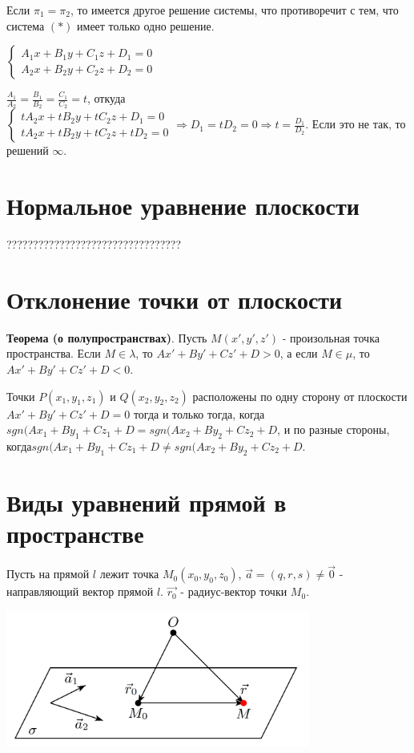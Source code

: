 \documentclass[a4paper]{article}
\begin{document}
{\begin{small}
Если $\pi_1 = \pi_2$, то имеется другое решение системы, что противоречит с тем, что система $(*)$ имеет только одно решение.

$\begin{cases}
   A_1x+B_1y+C_1z+D_1 = 0
   \\
   A_2x+B_2y+C_2z+D_2 = 0
 \end{cases}$
 
$\displaystyle \frac{A_1}{A_2} = \frac{B_1}{B_2} = \frac{C_1}{C_2} = t$, откуда $\begin{cases}
   tA_2x+tB_2y+tC_2z+D_1 = 0
   \\
   tA_2x+tB_2y+tC_2z+tD_2 = 0
 \end{cases} \Rightarrow D_1 = tD_2 = 0 \Rightarrow \displaystyle t = \frac{D_1}{D_2}$. Если это не так, то решений $\infty$.
 
\section*{Нормальное уравнение плоскости}

?????????????????????????????????

\section*{Отклонение точки от плоскости}

\textbf{Теорема (о полупространствах)}. Пусть $M(x', y', z')$ - произольная точка пространства. Если $M \in \lambda$, то $Ax' + By' + Cz' + D > 0$, а если $M \in \mu$, то $Ax' + By' + Cz' + D < 0$.

Точки $P(x_1, y_1, z_1)$ и $Q(x_2, y_2, z_2)$ расположены по одну сторону от плоскости\newline $Ax' + By' + Cz' + D = 0$ тогда и только тогда, когда\newline $sgn(Ax_1 + By_1 +Cz_1+D = sgn(Ax_2 + By_2 + Cz_2 + D$, и по разные стороны, когда\newline $sgn(Ax_1 + By_1 +Cz_1+D \neq sgn(Ax_2 + By_2 + Cz_2 + D$.

\section*{Виды уравнений прямой в пространстве}

Пусть на прямой $l$ лежит точка $M_0(x_0,y_0,z_0)$, $\vec{a} = (q,r,s) \neq \vec{0}$ - направляющий вектор прямой $l$. $\vec{r_0}$ - радиус-вектор точки $M_0$.

\includegraphics[width=10cm]{t8}


\end{small}}
\end{document}
